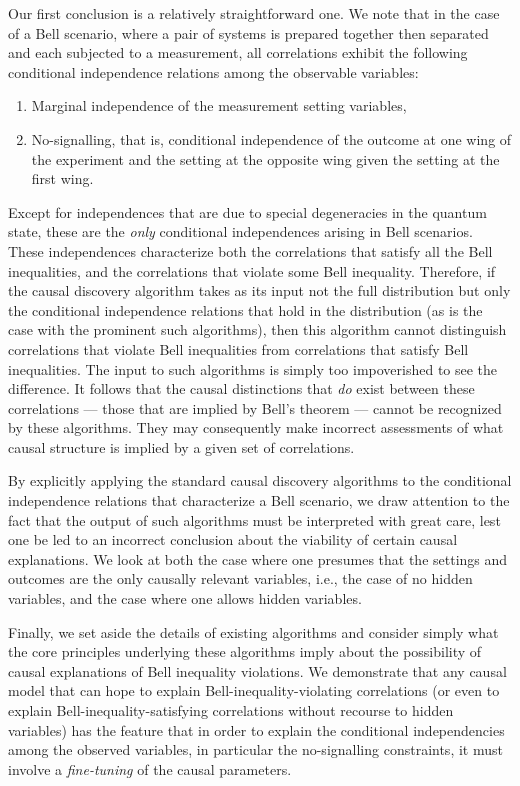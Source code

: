 \documentclass[12pt,onecolumn,nofootinbib]{revtex4-2}
\begin{document}
Our first conclusion is a relatively straightforward one.  We note that in the case of  a Bell scenario, where a pair of systems is prepared together then separated and each subjected to a measurement, \color{black} all correlations exhibit the following conditional independence relations among the observable variables:
\begin{enumerate}
\item Marginal independence of the measurement setting variables,
\item No-signalling, that is, conditional independence of the outcome at one wing of the experiment and the setting at the opposite wing given the setting at the first wing.
\end{enumerate}
Except for independences that are due to special degeneracies in the quantum state,  these are the \emph{only} conditional independences arising in Bell scenarios.
These independences characterize both the correlations that satisfy all the Bell inequalities, and the correlations that violate some Bell inequality. Therefore, if the causal discovery algorithm takes as its input not the full distribution but only the conditional independence relations that hold in the distribution (as is the case with the prominent such algorithms), then this algorithm cannot distinguish
correlations that violate Bell inequalities from correlations that satisfy
Bell inequalities. The input to such algorithms is simply too impoverished
to see the difference. It follows that the causal distinctions that \emph{do}
exist between these correlations --- those that are implied by Bell's theorem --- cannot be
recognized by these algorithms.  They may consequently make incorrect
assessments of what causal structure is implied by a given set of
correlations.


By explicitly applying the standard causal discovery algorithms to the conditional independence relations that characterize a Bell scenario, we draw attention to the fact that the output of such algorithms must be interpreted with great care, lest one be led to an incorrect conclusion about the viability of certain causal explanations.  We look at both the case where one presumes that the settings and outcomes are the only causally relevant variables, i.e., the case of no hidden variables, and the case where one allows hidden variables.
 
Finally, we set aside the details of existing algorithms and consider simply what the core principles underlying these algorithms imply about the possibility of causal explanations of Bell inequality violations. 
We demonstrate that any causal model that can hope to explain Bell-inequality-violating correlations (or even to explain Bell-inequality-satisfying correlations without recourse to hidden variables) has the feature that in order to explain the conditional independencies among the observed variables, in particular the no-signalling constraints, it must involve a \emph{fine-tuning} of the causal parameters.
\end{document}
